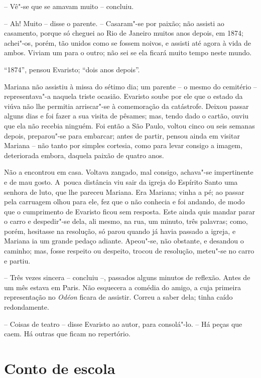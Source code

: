 -- Vê"-se que se amavam muito -- concluiu.

-- Ah! Muito -- disse o parente. -- Casaram"-se por paixão; não assisti
ao casamento, porque só cheguei ao Rio de Janeiro muitos anos depois, em
1874; achei"-os, porém, tão unidos como se fossem noivos, e assisti até
agora à vida de ambos. Viviam um para o outro; não sei se ela ficará
muito tempo neste mundo.

``1874'', pensou Evaristo; ``dois anos depois''.

Mariana não assistiu à missa do sétimo dia; um parente -- o mesmo do
cemitério -- representava"-a naquela triste ocasião. Evaristo soube por
ele que o estado da viúva não lhe permitia arriscar"-se à comemoração da
catástrofe. Deixou passar alguns dias e foi fazer a sua visita de
pêsames; mas, tendo dado o cartão, ouviu que ela não recebia ninguém.
Foi então a São Paulo, voltou cinco ou seis semanas depois, preparou"-se
para embarcar; antes de partir, pensou ainda em visitar Mariana -- não
tanto por simples cortesia, como para levar consigo a imagem,
deteriorada embora, daquela paixão de quatro anos.

Não a encontrou em casa. Voltava zangado, mal consigo, achava"-se
impertinente e de mau gosto. A~pouca distância viu sair da igreja do
Espírito Santo uma senhora de luto, que lhe pareceu Mariana. Era
Mariana; vinha a pé; ao passar pela carruagem olhou para ele, fez que o
não conhecia e foi andando, de modo que o cumprimento de Evaristo ficou
sem resposta. Este ainda quis mandar parar o carro e despedir"-se dela,
ali mesmo, na rua, um minuto, três palavras; como, porém, hesitasse na
resolução, só parou quando já havia passado a igreja, e Mariana ia um
grande pedaço adiante. Apeou"-se, não obstante, e desandou o caminho;
mas, fosse respeito ou despeito, trocou de resolução, meteu"-se no carro
e partiu.

-- Três vezes sincera -- concluiu --, passados alguns minutos de
reflexão. Antes de um mês estava em Paris. Não esquecera a comédia do
amigo, a cuja primeira representação no \emph{Odéon} ficara de assistir.
Correu a saber dela; tinha caído redondamente.

-- Coisas de teatro -- disse Evaristo ao autor, para consolá"-lo. -- Há
peças que caem. Há outras que ficam no repertório.

\chapter{Conto de escola}

